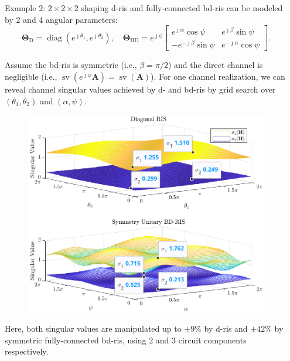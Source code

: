 \documentclass[final,xcolor={table}]{beamer}
\DeclareMathOperator{\diag}{diag}
\DeclareMathOperator{\sv}{sv}
\newlength{\sepwidth}
\newlength{\colwidth}
\newcommand{\separatorcolumn}{\begin{column}{\sepwidth}\end{column}}
\begin{document}
\begin{frame}[t]
\begin{columns}[t]
\begin{column}{\colwidth}
			\begin{exampleblock}{Example 2: $2 \times 2 \times 2$ shaping}
				\setlength{\leftskip}{\leftmargini}
				\setlength{\rightskip}{\leftmargini}
				\gls{d}-\gls{ris} and fully-connected \gls{bd}-\gls{ris} can be modeled by 2 and 4 angular parameters:
				\begin{equation*}
					\mathbf{\Theta}_\mathrm{D} = \diag(e^{\jmath \theta_1}, e^{\jmath \theta_2}), \quad
					\mathbf{\Theta}_\mathrm{BD} = e^{\jmath \phi} \begin{bmatrix}
						e^{\jmath \alpha} \cos \psi  & e^{\jmath \beta} \sin \psi   \\
						-e^{-\jmath \beta} \sin \psi & e^{-\jmath \alpha} \cos \psi
					\end{bmatrix}.
				\end{equation*}

				Assume the \gls{bd}-\gls{ris} is symmetric (i.e., $\beta = \pi / 2$) and the direct channel is negligible (i.e., $\sv(e^{\jmath \phi} \mathbf{A}) = \sv(\mathbf{A})$).
				For one channel realization, we can reveal channel singular values achieved by \gls{d}- and \gls{bd}-\gls{ris} by grid search over $(\theta_1, \theta_2)$ and $(\alpha, \psi)$.
				\begin{figure}
					\centering
					\includegraphics[width=0.41\columnwidth]{../assets/simulation/pc_singular_trend.eps}
				\end{figure}
				Here, both singular values are manipulated up to $\pm 9\%$ by \gls{d}-\gls{ris} and $\pm 42\%$ by symmetric fully-connected \gls{bd}-\gls{ris}, using 2 and 3 circuit components respectively.
			\end{exampleblock}
		\end{column}

		\separatorcolumn


\end{columns}
\end{frame}
\end{document}
